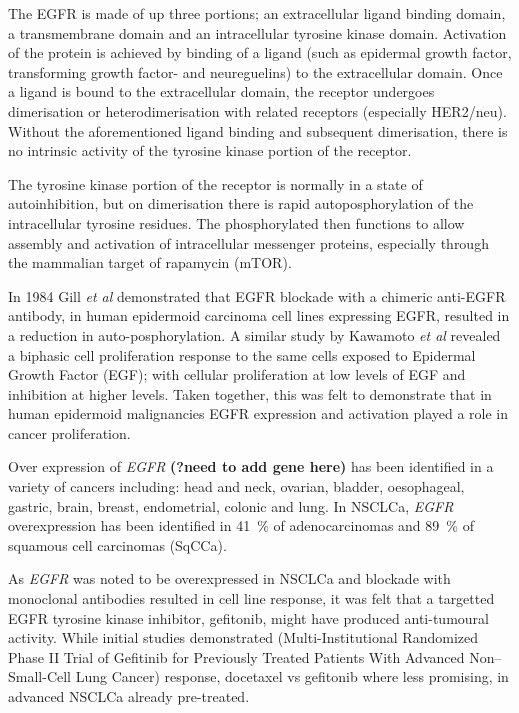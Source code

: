The EGFR is made of up three portions; an extracellular ligand binding domain, a transmembrane domain and an intracellular tyrosine kinase domain\supercite{Krause:2005fa, Yarden:2001ta}. Activation of the protein is achieved by binding of a ligand (such as epidermal growth factor, transforming growth \mbox{factor-\textalpha} and neureguelins\supercite{Yarden:2001ta}) to the extracellular domain. Once a ligand is bound to the extracellular domain, the receptor undergoes dimerisation or heterodimerisation with related receptors (especially HER2/neu\supercite{Tzahar:1996us}). Without the aforementioned ligand binding and subsequent dimerisation, there is no intrinsic activity of the tyrosine kinase portion of the receptor\supercite{Yarden:2001ta}. 

The tyrosine kinase portion of the receptor is normally in a state of autoinhibition, but on dimerisation there is rapid autoposphorylation of the intracellular tyrosine residues. The phosphorylated then functions to allow assembly and activation of intracellular messenger proteins\supercite{Lemmon:2010bq, Cohen:1981th}, especially through the mammalian target of rapamycin (mTOR)\supercite{Siegelin:2014jj}. 

In 1984 Gill \textit{et al} demonstrated that EGFR blockade with a chimeric anti-EGFR antibody, in human epidermoid carcinoma cell lines expressing EGFR, resulted in a reduction in \mbox{auto-posphorylation}\supercite{Gill:1984wv}. A similar study by Kawamoto \textit{et al} revealed a biphasic cell proliferation response to the same cells exposed to Epidermal Growth Factor (EGF); with cellular proliferation at low levels of EGF and inhibition at higher levels. Taken together, this was felt to demonstrate that in human epidermoid malignancies EGFR expression and activation played a role in  cancer proliferation. 

Over expression of \textit{EGFR} \textbf{(?need to add gene here)} has been identified in a variety of cancers including: head and neck, ovarian, bladder, oesophageal, gastric, brain, breast, endometrial, colonic and lung\supercite{Sharma:2007dx}. In NSCLCa, \textit{EGFR} overexpression has been identified in 41~\% of adenocarcinomas\supercite{Lynch:2004ii} and 89~\% of squamous cell carcinomas (SqCCa)\supercite{AlOlayan:2012dx}. 

As \textit{EGFR} was noted to be overexpressed in NSCLCa\supercite{Lynch:2004ii, AlOlayan:2012dx} and blockade with monoclonal antibodies\supercite{Gill:1984wv} resulted in cell line response, it was felt that a targetted EGFR tyrosine kinase inhibitor, gefitonib, might have produced anti-tumoural activity. While initial studies demonstrated (Multi-Institutional Randomized Phase II Trial of Gefitinib for
Previously Treated Patients With Advanced Non–Small-Cell
Lung Cancer) response, docetaxel vs gefitonib where less promising, in advanced NSCLCa already pre-treated.  

